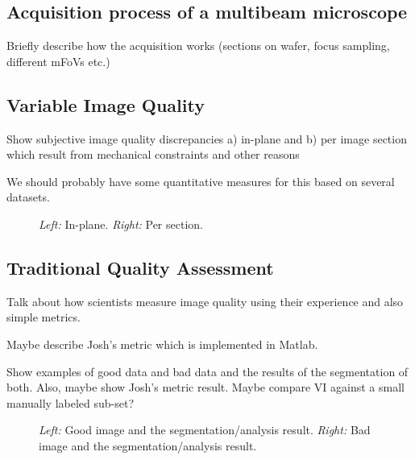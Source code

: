 \documentclass{llncs}
\begin{document}
\subsection{Acquisition process of a multibeam microscope}

Briefly describe how the acquisition works (sections on wafer, focus sampling, different mFoVs etc.)

\subsection{Variable Image Quality}

Show subjective image quality discrepancies a) in-plane and b) per image section which result from mechanical constraints and other reasons

We should probably have some quantitative measures for this based on several datasets.

\begin{figure}
\caption{\emph{Left:} In-plane. \emph{Right:} Per section.}
\end{figure}

\subsection{Traditional Quality Assessment}

Talk about how scientists measure image quality using their experience and also simple metrics.

Maybe describe Josh's metric which is implemented in Matlab.

Show examples of good data and bad data and the results of the segmentation of both. Also, maybe show Josh's metric result. Maybe compare VI against a small manually labeled sub-set?

\begin{figure}
\caption{\emph{Left:} Good image and the segmentation/analysis result. \emph{Right:} Bad image and the segmentation/analysis result.}
\end{figure}
\end{document}
